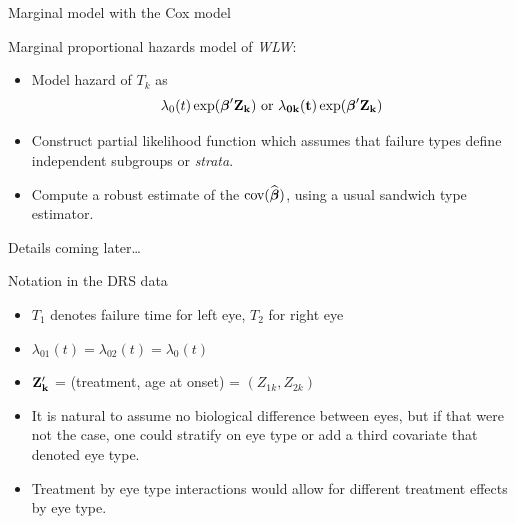 \documentclass[ignorenonframetext,]{beamer}
\newcommand{\bbeta}{\mbox{\boldmath$\beta$}}
\newcommand{\bZ}{\bf Z}
\begin{document}
\begin{frame}{%
\protect\hypertarget{marginal-model-with-the-cox-model}{%
Marginal model with the Cox model}}

Marginal proportional hazards model of \emph{WLW}:

\begin{itemize}
\item
  Model hazard of \(T_k\) as \[
        \lambda_0(t) \exp(\bbeta^\prime \bZ_k) \mbox{ or } 
        \lambda_{0k}(t) \exp(\bbeta^\prime \bZ_k)
    \]
\item
  Construct partial likelihood function which assumes that failure types
  define independent subgroups or \emph{strata}.
\item
  Compute a robust estimate of the \(\mbox{cov}(\widehat{\bbeta})\),
  using a usual sandwich type estimator.
\end{itemize}

Details coming later\ldots

\end{frame}

\begin{frame}{%
\protect\hypertarget{notation-in-the-drs-data}{%
Notation in the DRS data}}

\begin{itemize}
\item
  \(T_1\) denotes failure time for left eye, \(T_2\) for right eye
\item
  \(\lambda_{01}(t) = \lambda_{02}(t) = \lambda_0(t)\)
\item
  \(\bZ_k^\prime\) = (treatment, age at onset) = \((Z_{1k},Z_{2k})\)
\item
  It is natural to assume no biological difference between eyes, but if
  that were not the case, one could stratify on eye type or add a third
  covariate that denoted eye type.
\item
  Treatment by eye type interactions would allow for different treatment
  effects by eye type.
\end{itemize}

\end{frame}
\end{document}

